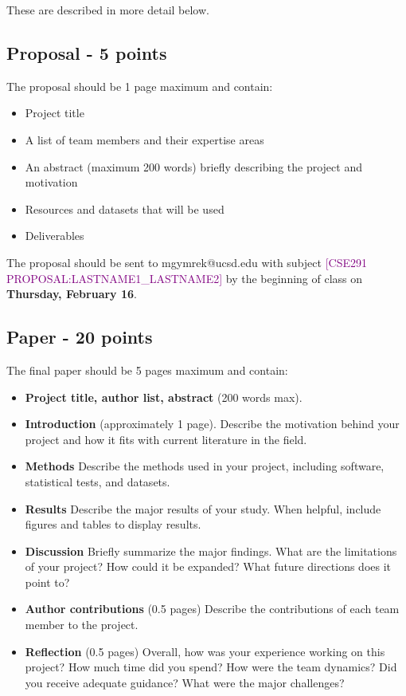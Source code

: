 \documentclass[12pt]{article}
\begin{document}
These are described in more detail below.

\subsection*{Proposal - 5 points}
The proposal should be 1 page maximum and contain:
\begin{itemize}
\setlength\itemsep{0.0em}
\item Project title
\item A list of team members and their expertise areas
\item An abstract (maximum 200 words) briefly describing the project and motivation
\item Resources and datasets that will be used
\item Deliverables
\end{itemize}

The proposal should be sent to mgymrek@ucsd.edu with subject \textcolor{purple}{[CSE291 PROPOSAL:LASTNAME1\_LASTNAME2]} by the beginning of class on \textbf{Thursday, February 16}. 

\subsection*{Paper - 20 points}
The final paper should be 5 pages maximum and contain:
\begin{itemize}
\setlength\itemsep{0.0em}
\item \textbf{Project title, author list, abstract} (200 words max).
\item \textbf{Introduction} (approximately 1 page). Describe the motivation behind your project and how it fits with current literature in the field.
\item \textbf{Methods} Describe the methods used in your project, including software, statistical tests, and datasets.
\item \textbf{Results} Describe the major results of your study. When helpful, include figures and tables to display results.
\item \textbf{Discussion} Briefly summarize the major findings. What are the limitations of your project? How could it be expanded? What future directions does it point to?
\item \textbf{Author contributions} (0.5 pages) Describe the contributions of each team member to the project. 
\item \textbf{Reflection} (0.5 pages) Overall, how was your experience working on this project? How much time did you spend? How were the team dynamics? Did you receive adequate guidance? What were the major challenges?
\end{itemize}
\end{document}
